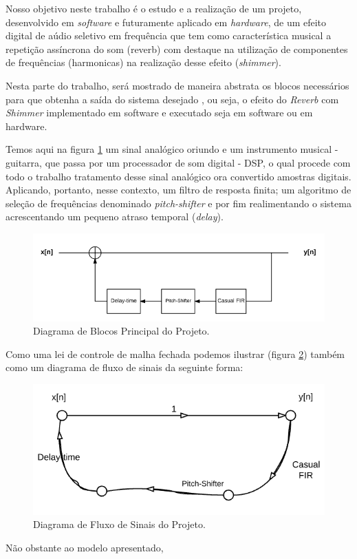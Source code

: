 	Nosso objetivo neste trabalho é o estudo e a realização de um projeto, desenvolvido em \textit{software} e futuramente aplicado em \textit{hardware}, de um efeito digital de aúdio seletivo em frequência que tem como característica musical a repetição assíncrona do som (reverb) com destaque na utilização de componentes de frequências (harmonicas) na realização desse efeito (\textit{shimmer}).
	
	Nesta parte do trabalho, será mostrado de maneira abstrata os blocos necessários para que obtenha a saída do sistema desejado , ou seja, o efeito do \textit{Reverb} com \textit{Shimmer} implementado em software e executado seja em software ou em hardware.
		
	Temos aqui na figura \ref{bloco-principal} um sinal analógico oriundo e um instrumento musical - guitarra, que passa por um processador de som digital - DSP, o qual procede com todo o trabalho tratamento desse sinal analógico ora convertido amostras digitais. Aplicando, portanto, nesse contexto, um filtro de resposta finita; um algoritmo de seleção de frequências denominado \textit{pitch-shifter} e por fim realimentando o sistema acrescentando um pequeno atraso temporal (\textit{delay}).
	
	\begin{figure}[!h t b]
		\centering
		\includegraphics[scale=0.5]{./figuras/diagrama_bloco_principal.PNG}
		\caption{Diagrama de Blocos Principal do Projeto.}
		\label{bloco-principal}
	\end{figure}
	

	Como uma lei de controle de malha fechada podemos ilustrar (figura \ref{signal_principal}) também como um diagrama de fluxo de sinais da seguinte forma:
	
	\begin{figure}[!h t b]
		\centering
		\includegraphics[scale=0.5]{./figuras/fluxo_de_sinais_principal.png}
		\caption{Diagrama de Fluxo de Sinais do Projeto.}	
		\label{signal_principal}
	\end{figure}
	
	Não obstante ao modelo apresentado,
	
	
	
	
	

